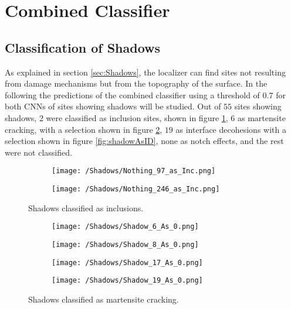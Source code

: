 \section{Combined Classifier}
%

\subsection{Classification of Shadows}
\label{sec:Robustness}
As explained in section \ref{sec:Shadows}, the localizer can find sites not resulting from damage mechanisms but from the topography of the surface. In the following the predictions of the combined classifier using a threshold of $0.7$ for both CNNs of sites showing shadows will be studied. Out of $55$ sites showing shadows, $2$ were classified as inclusion sites, shown in figure \ref{fig:shadowAsInc}, $6$ as martensite cracking, with a selection shown in figure \ref{fig:shadowAsMC}, $19$ as interface decohesions with a selection shown in figure \ref{fig:shadowAsID}, none as notch effects, and the rest were not classified.

\begin{figure}[H]
\centering
\begin{subfigure}{0.24\textwidth}
\texttt{[image: /Shadows/Nothing\_97\_as\_Inc.png]}
\caption{}
\end{subfigure}
\centering
\begin{subfigure}{0.24\textwidth}
\texttt{[image: /Shadows/Nothing\_246\_as\_Inc.png]}
\caption{}
\end{subfigure}
\caption{Shadows classified as inclusions.}
\label{fig:shadowAsInc}
\end{figure}

\begin{figure}[H]
\centering
\begin{subfigure}{0.24\textwidth}
\texttt{[image: /Shadows/Shadow\_6\_As\_0.png]}
\caption{}
\end{subfigure}
\centering
\begin{subfigure}{0.24\textwidth}
\texttt{[image: /Shadows/Shadow\_8\_As\_0.png]}
\caption{}
\end{subfigure}
\centering
\begin{subfigure}{0.24\textwidth}
\texttt{[image: /Shadows/Shadow\_17\_As\_0.png]}
\caption{}
\end{subfigure}
\centering
\begin{subfigure}{0.24\textwidth}
\texttt{[image: /Shadows/Shadow\_19\_As\_0.png]}
\caption{}
\end{subfigure}
\caption{Shadows classified as martensite cracking.}
\label{fig:shadowAsMC}
\end{figure}

